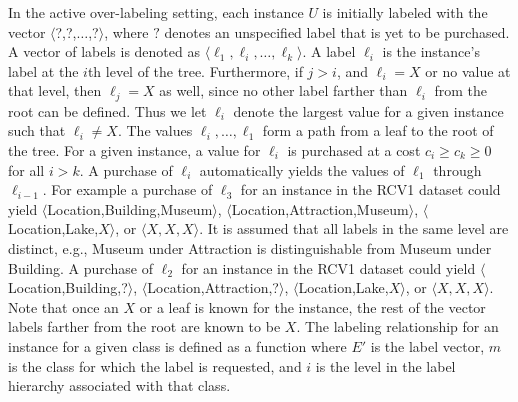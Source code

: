 \documentclass[ms]{nuthesis}
\begin{document}
In the active over-labeling setting, each instance $U$ is initially labeled with the vector
$\langle$?,?,$\ldots$,?$\rangle$, where $?$ denotes an unspecified label that is yet to be
purchased. A vector of labels is denoted as $\langle \ell_1,\ell_i,\ldots,\ell_k \rangle$.
A label $\ell_i$ is the instance's label at the $i$th
level of the tree. Furthermore, if $j > i$, and $\ell_i = X$ or no value at that level,
then $\ell_j=X$ as well, since no other label farther than $\ell_i$
from the root can be defined. Thus we let $\ell_i$ denote the largest value for a given
 instance such that $\ell_i \neq X$. The values $\ell_i,\ldots,\ell_1$ form a path
  from a leaf to the root of the tree. For a given instance, a value for $\ell_i$ is purchased
  at a cost $c_i \geq c_k \geq 0$ for all $i>k$. A purchase of $\ell_i$ automatically
  yields the values of $\ell_1$ through $\ell_{i-1}$. For example a purchase of $\ell_3$ for
  an instance in the RCV1 dataset could yield $\langle$Location,Building,Museum$\rangle$,
  $\langle$Location,Attraction,Museum$\rangle$,
$\langle$Location,Lake,$X\rangle$, or $\langle X,X,X \rangle$. It is assumed
that all labels in the same level are distinct, e.g., Museum under Attraction
is distinguishable from Museum under Building. A purchase of $\ell_2$ for an instance
in the RCV1 dataset could yield $\langle$Location,Building,?$\rangle$,  $\langle$Location,Attraction,?$\rangle$,
$\langle$Location,Lake,$X\rangle$, or $\langle X,X,X \rangle$. Note that once an $X$ or
a leaf is known for the instance, the rest of the vector labels farther from the root are
known to be $X$. The labeling relationship for an instance for a given
class is defined as a function
 where $E'$ is the label vector,
$m$ is the class for which the label is requested, and $i$ is the
level in the label hierarchy associated with that class.
\end{document}
